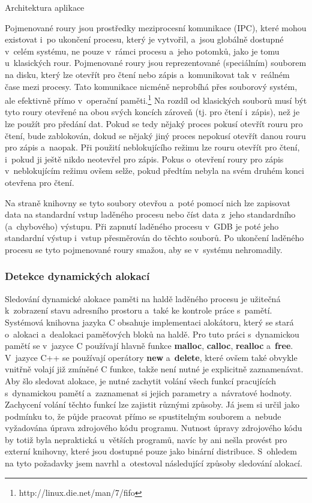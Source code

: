 \documentclass[czech,bachelor,male,python,dept460,hidelinks]{diploma}						%
\newcommand{\parspace}[1][]{
	\ifthenelse{\isempty{#1}}{\vspace{0mm}}{\vspace{#1}}
	\par
}
\begin{document}
\begin{section}{Architektura aplikace}
			\parspace Pojmenované roury jsou prostředky meziprocesní komunikace (IPC), které mohou existovat i~po ukončení procesu, který je vytvořil, a~jsou globálně
			dostupné v~celém systému, ne pouze v~rámci procesu a~jeho potomků, jako je tomu u~klasických rour. Pojmenované roury jsou reprezentované (speciálním)
			souborem na disku, který lze otevřít pro čtení nebo zápis a~komunikovat tak v~reálném čase mezi procesy. Tato komunikace nicméně neprobíhá 
			přes souborový systém, ale efektivně přímo v~operační paměti.\footnote{http://linux.die.net/man/7/fifo}
			Na rozdíl od klasických souborů musí být tyto roury otevřené na obou svých koncích zároveň (tj. pro čtení i~zápis), než je lze použít pro předání dat.
			Pokud se tedy nějaký proces pokusí otevřít rouru pro čtení, bude zablokován, dokud se nějaký jiný proces nepokusí otevřít danou
			rouru pro zápis a~naopak. Při použití neblokujícího režimu lze rouru otevřít pro čtení, i~pokud ji ještě nikdo neotevřel pro zápis.
			Pokus o~otevření roury pro zápis v~neblokujícím režimu ovšem selže, pokud předtím nebyla na svém druhém konci otevřena pro čtení.
			
			\parspace Na straně knihovny se tyto soubory otevřou a~poté pomocí nich lze zapisovat data na standardní vstup laděného procesu nebo číst data z~jeho
			standardního (a~chybového) výstupu. Při zapnutí laděného procesu v~GDB je poté jeho standardní výstup i~vstup přesměrován do těchto souborů.
			Po ukončení laděného procesu se tyto pojmenované roury smažou, aby se v~systému nehromadily.
			
			
		\subsubsection{Detekce dynamických alokací}
			Sledování dynamické alokace paměti na haldě laděného procesu je užitečná k~zobrazení stavu adresního prostoru a~také ke kontrole práce s~pamětí.
			Systémová knihovna jazyka C obsahuje implementaci alokátoru, který se stará o~alokaci a~dealokaci paměťových
			bloků na haldě. Pro tuto práci s~dynamickou pamětí se v~jazyce C používají hlavně funkce \textbf{malloc}, \textbf{calloc}, \textbf{realloc}
			a~\textbf{free}. V~jazyce C++ se používají operátory \textbf{new} a~\textbf{delete}, které ovšem také obvykle vnitřně volají již zmíněné C funkce,
			takže není nutné je explicitně zaznamenávat. Aby šlo sledovat alokace, je nutné zachytit volání všech funkcí pracujících s~dynamickou pamětí a~zaznamenat si
			jejich parametry a~návratové hodnoty. Zachycení volání těchto funkcí lze zajistit různými způsoby. Já jsem si určil jako podmínku to, že půjde pracovat
			přímo se spustitelným souborem a~nebude vyžadována úprava zdrojového kódu programu.
			Nutnost úpravy zdrojového kódu by totiž byla nepraktická u~větších programů, navíc by ani nešla provést pro externí knihovny, které jsou dostupné pouze
			jako binární distribuce.
			S~ohledem na tyto požadavky jsem navrhl a~otestoval následující způsoby sledování alokací.

\end{section}
\end{document}
